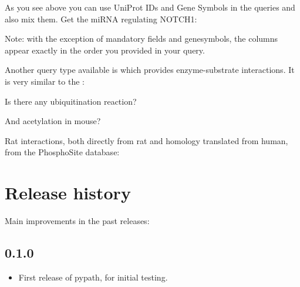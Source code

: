 \documentclass[letterpaper,10pt,english]{sphinxmanual}
\begin{document}
As you see above you can use UniProt IDs and Gene Symbols in the queries and
also mix them. Get the miRNA regulating NOTCH1:
\begin{quote}

\end{quote}

Note: with the exception of mandatory fields and genesymbols, the columns
appear exactly in the order you provided in your query.

Another query type available is  which provides enzyme-substrate
interactions. It is very similar to the :
\begin{quote}

\end{quote}

Is there any ubiquitination reaction?
\begin{quote}

\end{quote}

And acetylation in mouse?
\begin{quote}

\end{quote}

Rat interactions, both directly from rat and homology translated from human,
from the PhosphoSite database:
\begin{quote}

\end{quote}


\chapter{Release history}
\label{\detokenize{changelog:release-history}}\label{\detokenize{changelog::doc}}
Main improvements in the past releases:


\section{0.1.0}
\label{\detokenize{changelog:id1}}\begin{itemize}
\item {} 
First release of pypath, for initial testing.

\end{itemize}
\end{document}
